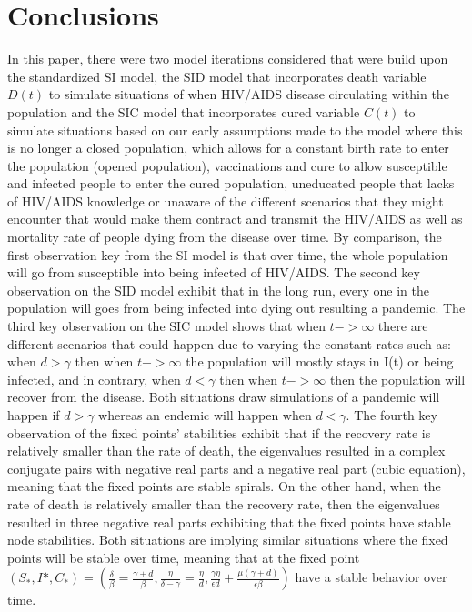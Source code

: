 \documentclass[a4paper, final, 12pt]{article}
\numberwithin{equation}{section}
\begin{document}
\section{Conclusions}\label{sec:Gini}
\hspace{22pt} In this paper, there were two model iterations considered that were build upon the standardized SI model, the SID model that incorporates death variable $D(t)$ to simulate situations of when HIV/AIDS disease circulating within the population and the SIC model that incorporates cured variable $C(t)$ to simulate situations based on our early assumptions made to the model where this is no longer a closed population, which allows for a constant birth rate to enter the population (opened population), vaccinations and cure to allow susceptible and infected people to enter the cured population, uneducated people that lacks of HIV/AIDS knowledge or unaware of the different scenarios that they might encounter that would make them contract and transmit the HIV/AIDS as well as mortality rate of people dying from the disease over time. By comparison, the first observation key from the SI model is that over time, the whole population will go from susceptible into being infected of HIV/AIDS. The second key observation on the SID model exhibit that in the long run, every one in the population will goes from being infected into dying out resulting a pandemic. The third key observation on the SIC model shows that when $t -> \infty$ there are different scenarios that could happen due to varying the constant rates such as: when $d > \gamma$ then when $t -> \infty$ the population will mostly stays in I(t) or being infected, and in contrary, when $d < \gamma$ then when $t -> \infty$ then the population will recover from the disease. Both situations draw simulations of a pandemic will happen if $d > \gamma$ whereas an endemic will happen when $d < \gamma$. The fourth key observation of the fixed points' stabilities exhibit that if the recovery rate is relatively smaller than the rate of death, the eigenvalues resulted in a complex conjugate pairs with negative real parts and a negative real part (cubic equation), meaning that the fixed points are stable spirals. On the other hand, when the rate of death is relatively smaller than the recovery rate, then the eigenvalues resulted in three negative real parts exhibiting that the fixed points have stable node stabilities. Both situations are implying similar situations where the fixed points will be stable over time, meaning that at the fixed point $(S_{*}, I{*}, C_{*}) = (\frac{\delta}{\beta} = \frac{\gamma + d}{\beta}, \frac{\eta}{\delta - \gamma} = \frac{\eta}{d}, \frac{\gamma \eta}{\epsilon d} + \frac{\mu (\gamma + d)}{\epsilon \beta})$ have a stable behavior over time. \\
\end{document}
